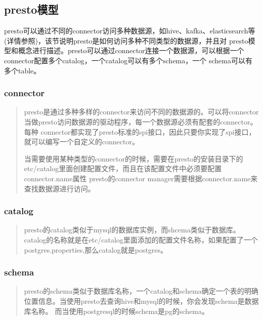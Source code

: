 \documentclass[letterpaper,10pt,english]{sphinxmanual}
\begin{document}
\subsection{presto模型}
\label{\detokenize{overview/concept:id2}}
\begin{sphinxVerbatim}[commandchars=\\\{\}]
presto可以通过不同的connector访问多种数据源，如hive、kafka、elasticsearch等(详情参照)，该节说明presto是如何访问多种不同类型的数据源，并且对
presto模型和概念进行描述。presto可以通过connector连接一个数据源，可以根据一个connector配置多个catalog，一个catalog可以有多个schema，一个
schema可以有多个table。
\end{sphinxVerbatim}

\noindent{}


\subsubsection{connector}
\label{\detokenize{overview/concept:connector}}\begin{quote}

presto是通过多种多样的connector来访问不同的数据源的。可以将connector当做presto访问数据源的驱动程序，每一个数据源必须有配套的connector。每种
connector都实现了presto标准的spi接口，因此只要你实现了spi接口，就可以编写一个自定义的connector。

当需要使用某种类型的connector的时候，需要在presto的安装目录下的etc/catalog里面创建配置文件，而且在该配置文件中必须要配置connector.name属性
presto的connector manager需要根据connector.name来查找数据源进行访问。
\end{quote}


\subsubsection{catalog}
\label{\detokenize{overview/concept:catalog}}\begin{quote}

presto的catalog类似于mysql的数据库实例，而shcema类似于数据库。catalog的名称就是在etc/catalog里面添加的配置文件名称，如果配置了一个
postgres.properties,那么catalog就是postgres。
\end{quote}


\subsubsection{schema}
\label{\detokenize{overview/concept:schema}}\begin{quote}

presto的schema类似于数据库名称，一个catalog和schema确定一个表的明确位置信息。当使用presto去查询hive和mysql的时候，你会发现schema是数据库名称。
而当使用postgresql的时候schema是pg的schema。
\end{quote}
\end{document}
